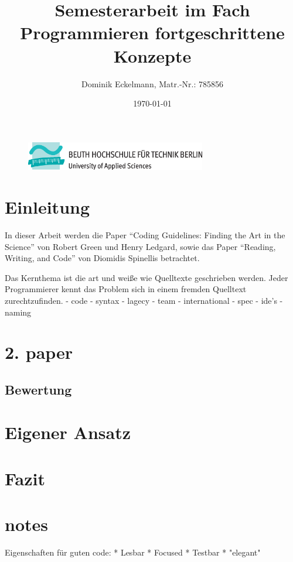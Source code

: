 \documentclass[a4paper]{article}
\title{Semesterarbeit im Fach Programmieren fortgeschrittene Konzepte}
\author{Dominik Eckelmann, Matr.-Nr.: 785856}
\date{\today}
\begin{document}
\sloppy

\begin{figure}[H]
	\centering
	\includegraphics[width=0.7\textwidth]{beuth.eps}
	\maketitle
\end{figure}

\newpage
\tableofcontents

\newpage
\section{Einleitung}

In dieser Arbeit werden die Paper \enquote{Coding Guidelines: Finding the Art in the Science} von Robert Green und Henry Ledgard\cite{Green}, sowie das Paper \enquote{Reading, Writing, and Code} von Diomidis Spinellis betrachtet. 

Das Kernthema ist die art und weiße wie Quelltexte geschrieben werden. Jeder Programmierer kennt das Problem sich in einem fremden Quelltext zurechtzufinden.
\cite{Knuth}
 - code
 - syntax
 - lagecy
 - team
 - international
 - spec
 - ide's
 - naming




\section{2. paper}

\subsection{Bewertung}

\section{Eigener Ansatz}

\section{Fazit}


\section{notes}
Eigenschaften für guten code: \cite{Heusser}
  * Lesbar
  * Focused
  * Testbar
  * "elegant"
\end{document}
